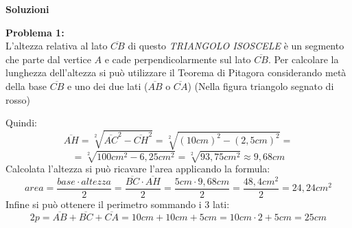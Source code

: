 \documentclass[14pt]{extarticle}
\begin{document}

\begin{center}\textbf{Soluzioni}\end{center}

\textbf{Problema 1:}\\
L'altezza relativa al lato \(\overline{CB}\) di questo \textit{TRIANGOLO ISOSCELE} è un segmento che parte dal vertice \(A\) e cade perpendicolarmente sul lato \(\overline{CB}\). Per calcolare la lunghezza dell'altezza si può utilizzare il Teorema di Pitagora considerando metà della base \(\overline{CB}\) e uno dei due lati (\(\overline{AB}\) o \(\overline{CA}\)) (Nella figura triangolo segnato di rosso) \\
\begin{center}
\end{center}
Quindi:
\[\overline{AH}=\sqrt[2]{\overline{AC}^2-\overline{CH}^2}=\sqrt[2]{(10cm)^2-(2,5cm)^2}=\]\[=\sqrt[2]{100cm^2-6,25cm^2}=\sqrt[2]{93,75cm^2}\approx9,68cm\]
Calcolata l'altezza si può ricavare l'area applicando la formula:
\[area=\dfrac{base\cdot altezza}{2}=\dfrac{\overline{BC}\cdot\overline{AH}}{2}=\dfrac{5cm\cdot9,68cm}{2}=\dfrac{48,4cm^2}{2}=24,24cm^2\] 
Infine si può ottenere il perimetro sommando i 3 lati:
\[2p=\overline{AB}+\overline{BC}+\overline{CA}=10cm+10cm+5cm=10cm\cdot2+5cm=25cm\]
\end{document}
